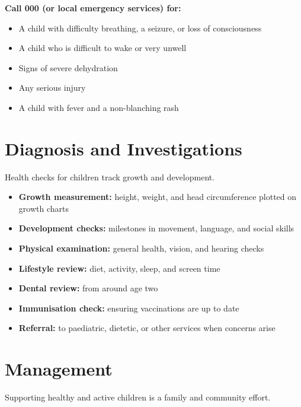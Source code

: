 \textbf{Call 000 (or local emergency services) for:}
\begin{itemize}
    \item A child with difficulty breathing, a seizure, or loss of consciousness
    \item A child who is difficult to wake or very unwell
    \item Signs of severe dehydration
    \item Any serious injury
    \item A child with fever and a non-blanching rash
\end{itemize}

\section*{Diagnosis and Investigations}
Health checks for children track growth and development.

\begin{itemize}
    \item \textbf{Growth measurement:} height, weight, and head circumference plotted on growth charts
    \item \textbf{Development checks:} milestones in movement, language, and social skills
    \item \textbf{Physical examination:} general health, vision, and hearing checks
    \item \textbf{Lifestyle review:} diet, activity, sleep, and screen time
    \item \textbf{Dental review:} from around age two
    \item \textbf{Immunisation check:} ensuring vaccinations are up to date
    \item \textbf{Referral:} to paediatric, dietetic, or other services when concerns arise
\end{itemize}

\section*{Management}
Supporting healthy and active children is a family and community effort.

